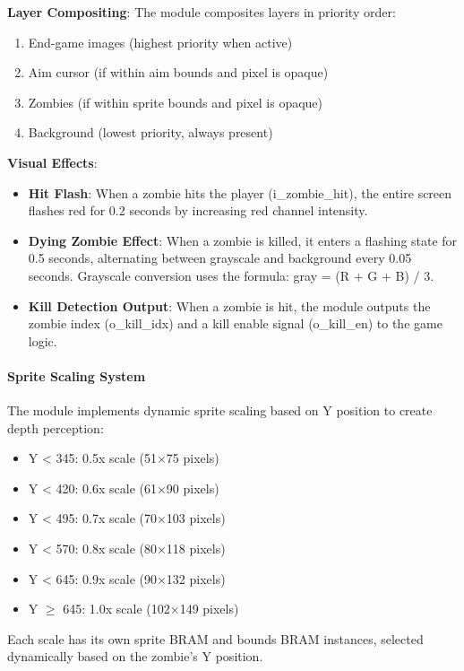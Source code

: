 \documentclass[12pt,a4paper]{article}
\begin{document}
\textbf{Layer Compositing}: The module composites layers in priority order:
\begin{enumerate}
    \item End-game images (highest priority when active)
    \item Aim cursor (if within aim bounds and pixel is opaque)
    \item Zombies (if within sprite bounds and pixel is opaque)
    \item Background (lowest priority, always present)
\end{enumerate}

\textbf{Visual Effects}:
\begin{itemize}
    \item \textbf{Hit Flash}: When a zombie hits the player (i\_zombie\_hit), the entire screen flashes red for 0.2 seconds by increasing red channel intensity.
    \item \textbf{Dying Zombie Effect}: When a zombie is killed, it enters a flashing state for 0.5 seconds, alternating between grayscale and background every 0.05 seconds. Grayscale conversion uses the formula: gray = (R + G + B) / 3.
    \item \textbf{Kill Detection Output}: When a zombie is hit, the module outputs the zombie index (o\_kill\_idx) and a kill enable signal (o\_kill\_en) to the game logic.
\end{itemize}

\paragraph{Sprite Scaling System}
The module implements dynamic sprite scaling based on Y position to create depth perception:
\begin{itemize}
    \item Y < 345: 0.5x scale (51×75 pixels)
    \item Y < 420: 0.6x scale (61×90 pixels)
    \item Y < 495: 0.7x scale (70×103 pixels)
    \item Y < 570: 0.8x scale (80×118 pixels)
    \item Y < 645: 0.9x scale (90×132 pixels)
    \item Y $\ge$ 645: 1.0x scale (102×149 pixels)
\end{itemize}

Each scale has its own sprite BRAM and bounds BRAM instances, selected dynamically based on the zombie's Y position.
\end{document}
